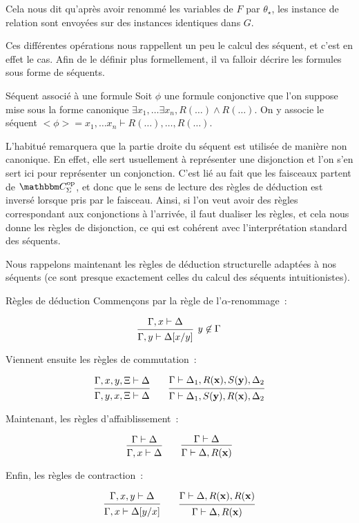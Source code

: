 Cela nous dit qu'après avoir renommé les variables de $F$ par $\theta_\star$, les
instance de relation sont envoyées sur des instances identiques dans $G$.

Ces différentes opérations nous rappellent un peu le calcul des séquent, et
c'est en effet le cas. Afin de le définir plus formellement, il va falloir décrire
les formules sous forme de séquents.

\begin{defi}{Séquent associé à une formule}
    Soit $\phi$ une formule conjonctive que l'on suppose mise sous la
    forme canonique $\exists x_1,\dots\exists x_n, R(\dots)\wedge R(\dots)$. On
    y associe le séquent $<\phi> = x_1,\dots x_n\vdash R(\dots), \dots, R(\dots)$.
\end{defi}

\begin{rem}
    L'habitué remarquera que la partie droite du séquent est utilisée de manière non
    canonique. En effet, elle sert usuellement à représenter une disjonction et
    l'on s'en sert ici pour représenter un conjonction. C'est lié au fait que
    les faisceaux partent de $\C_\Sigma^\text{op}$, et donc que le sens de lecture
    des règles de déduction est inversé lorsque pris par le faisceau. Ainsi, si l'on
    veut avoir des règles correspondant aux conjonctions à l'arrivée, il faut dualiser
    les règles, et cela nous donne les règles de disjonction, ce qui est cohérent avec
    l'interprétation standard des séquents.
\end{rem}

Nous rappelons maintenant les règles de déduction structurelle adaptées à nos séquents
(ce sont presque exactement celles du calcul des séquents intuitionistes).

\begin{defi}{Règles de déduction}
    Commençons par la règle de l'$\alpha$-renommage~:

    \[ \tproof{ \hypo{\Gamma, x\vdash \Delta}
         \infer1[$y\not\in\Gamma$]{\Gamma, y\vdash \Delta[x/y]} }\]

    Viennent ensuite les règles de commutation~:

    \[ \tproof{ \hypo{\Gamma, x, y, \Xi\vdash \Delta}
         \infer1{\Gamma, y, x, \Xi\vdash \Delta} }
       \qquad
       \tproof{ \hypo{\Gamma\vdash \Delta_1, R(\mathbf{x}), S(\mathbf{y}), \Delta_2}
         \infer1{\Gamma\vdash \Delta_1, S(\mathbf{y}), R(\mathbf{x}), \Delta_2} }
    \]

    Maintenant, les règles d'affaiblissement~:

    \[ \tproof{ \hypo{\Gamma\vdash\Delta}
         \infer1{\Gamma, x\vdash \Delta} }
       \qquad
       \tproof{ \hypo{\Gamma\vdash\Delta}
         \infer1{\Gamma\vdash\Delta,R(\mathbf{x})} }\]

    Enfin, les règles de contraction~:

    \[ \tproof{ \hypo{\Gamma,x,y\vdash\Delta}
         \infer1{\Gamma, x\vdash\Delta[y/x]} }
       \qquad
       \tproof{ \hypo{\Gamma\vdash\Delta, R(\mathbf{x}), R(\mathbf{x})}
         \infer1{\Gamma\vdash\Delta, R(\mathbf{x})} }\]

\end{defi}


